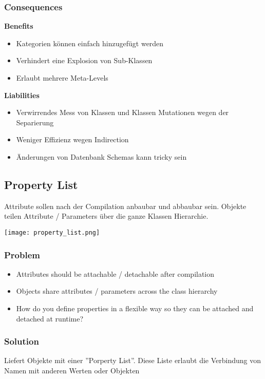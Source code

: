 \subsubsection{Consequences}
\textbf{Benefits}
\begin{itemize}
    \item Kategorien können einfach hinzugefügt werden
    \item Verhindert eine Explosion von Sub-Klassen
    \item Erlaubt mehrere Meta-Levels
\end{itemize}
\vspace{10pt}
\textbf{Liabilities}
\begin{itemize}
    \item Verwirrendes Mess von Klassen und Klassen Mutationen wegen der Separierung
    \item Weniger Effizienz wegen Indirection
    \item Änderungen von Datenbank Schemas kann tricky sein
\end{itemize}


\subsection{Property List}

Attribute sollen nach der Compilation anbaubar und abbaubar sein. Objekte teilen Attribute / Parameters über die ganze Klassen Hierarchie.

\texttt{[image: property\_list.png]}

\subsubsection{Problem}
\begin{itemize}
    \item Attributes should be attachable / detachable after compilation
    \item Objects share attributes / parameters across the class hierarchy
    \item How do you define properties in a flexible way so they can be attached and detached at runtime?
\end{itemize}

\subsubsection{Solution}
Liefert Objekte mit einer ''Porperty List''. Diese Liste erlaubt die Verbindung von Namen mit anderen Werten oder Objekten

